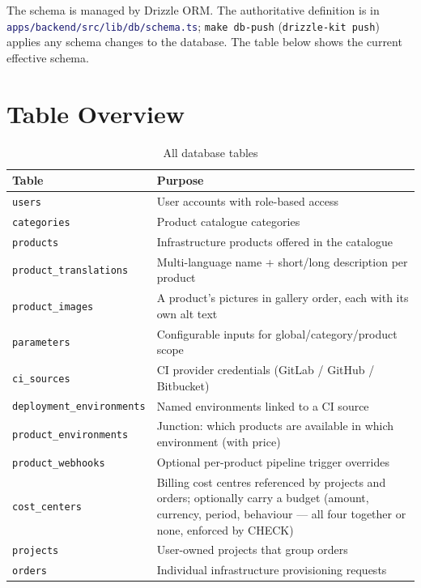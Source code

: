 \documentclass[12pt,a4paper,twoside]{report}
\newcommand{\code}[1]{\texttt{#1}}
\newcommand{\file}[1]{\texttt{\textcolor{MidnightBlue}{#1}}}
\begin{document}
The schema is managed by Drizzle ORM. The authoritative definition is
in \file{apps/backend/src/lib/db/schema.ts}; \code{make db-push}
(\code{drizzle-kit push}) applies any schema changes to the database.
The table below shows the current effective schema.

\section{Table Overview}
\label{sec:schema-overview}

\begin{table}[H]
  \centering
  \caption{All database tables}
  \begin{tabular}{@{}lp{9cm}@{}}
    \toprule
    \textbf{Table} & \textbf{Purpose} \\
    \midrule
    \code{users}                    & User accounts with role-based access \\
    \code{categories}               & Product catalogue categories \\
    \code{products}                 & Infrastructure products offered in the catalogue \\
    \code{product\_translations}    & Multi-language name + short/long description per product \\
    \code{product\_images}          & A product's pictures in gallery order, each with its own alt text \\
    \code{parameters}               & Configurable inputs for global/category/product scope \\
    \code{ci\_sources}              & CI provider credentials (GitLab / GitHub / Bitbucket) \\
    \code{deployment\_environments} & Named environments linked to a CI source \\
    \code{product\_environments}    & Junction: which products are available in which environment (with price) \\
    \code{product\_webhooks}        & Optional per-product pipeline trigger overrides \\
    \code{cost\_centers}            & Billing cost centres referenced by projects and orders; optionally carry a budget (amount, currency, period, behaviour --- all four together or none, enforced by CHECK) \\
    \code{projects}                 & User-owned projects that group orders \\
    \code{orders}                   & Individual infrastructure provisioning requests \\

\end{tabular}
\end{table}
\end{document}
